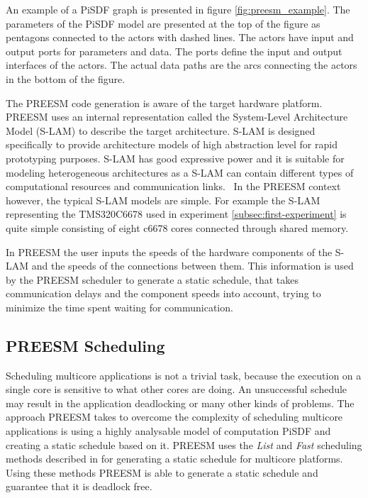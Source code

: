 An example of a PiSDF graph is presented in figure \ref{fig:preesm_example}. The parameters of the PiSDF model are presented at the top of the figure as pentagons connected to the actors with dashed lines. The actors have input and output ports for parameters and data. The ports define the input and output interfaces of the actors. The actual data paths are the arcs connecting the actors in the bottom of the figure.

The PREESM code generation is aware of the target hardware platform. PREESM uses an internal representation called the System-Level Architecture Model (S-LAM) \cite{pelcat2009system} to describe the target architecture. S-LAM is designed specifically to provide architecture models of high abstraction level for rapid prototyping purposes. S-LAM has good expressive power and it is suitable for modeling heterogeneous architectures as a S-LAM can contain different types of computational resources and communication links.~\cite{pelcat2009system} In the PREESM context however, the typical S-LAM models are simple. For example the S-LAM representing the TMS320C6678 used in experiment \ref{subsec:first-experiment} is quite simple consisting of eight c6678 cores connected through shared memory.

In PREESM the user inputs the speeds of the hardware components of the S-LAM and the speeds of the connections between them. This information is used by the PREESM scheduler to generate a static schedule, that takes communication delays and the component speeds into account, trying to minimize the time spent waiting for communication.~\cite{pelcat2009system}

\subsection{PREESM Scheduling}
\label{sec:preesm-scheduling}
Scheduling multicore applications is not a trivial task, because the execution on a single core is sensitive to what other cores are doing. An unsuccessful schedule may result in the application deadlocking or many other kinds of problems. The approach PREESM takes to overcome the complexity of scheduling multicore applications is using a highly analysable model of computation PiSDF and creating a static schedule based on it. PREESM uses the \textit{List} and \textit{Fast} scheduling methods described in \cite{kwok1997high} for generating a static schedule for multicore platforms. Using these methods PREESM is able to generate a static schedule and guarantee that it is deadlock free.

